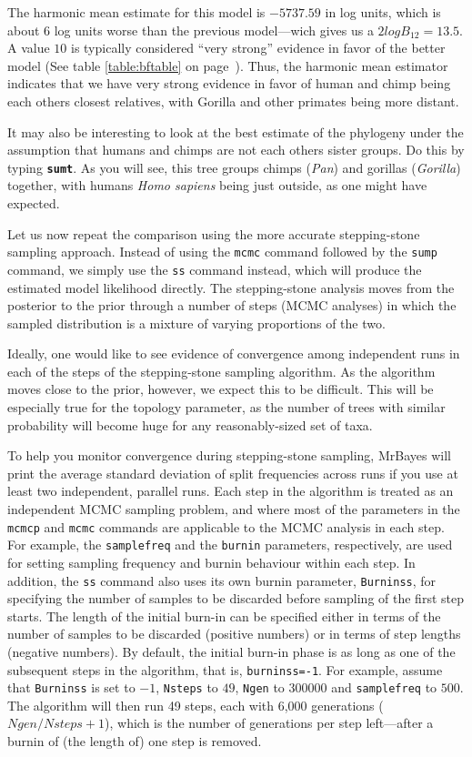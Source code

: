 \documentclass[12pt]{book}
\newcommand{\ttt}[1]{\texttt{#1}}
\newcommand{\tb}[1]{\ttt{\textbf{#1}}}
\begin{document}
The harmonic mean estimate for this model is $-5737.59$ in log units, which is about 6 log units
worse than the previous model---wich gives us a $2logB_{12} = 13.5$. A value $10$ is typically
considered ``very strong'' evidence in favor of the better model  (See table \ref{table:bftable} on page~\pageref{table:bftable}). Thus,
the harmonic mean estimator indicates that we have very strong evidence in favor of human and chimp
being each others closest relatives, with Gorilla and other primates being more distant.

It may also be interesting to look at the best estimate of the phylogeny under the assumption that
humans and chimps are not each others sister groups. Do this by typing \tb{sumt}. As you will see,
this tree groups chimps (\textit{Pan}) and gorillas (\textit{Gorilla}) together, with humans
\textit{Homo sapiens} being just outside, as one might have expected.

Let us now repeat the comparison using the more accurate stepping-stone sampling approach. Instead
of using the \texttt{mcmc} command followed by the \texttt{sump} command, we simply use the \texttt{ss}
command instead, which will produce the estimated model likelihood directly. The stepping-stone
analysis moves from the posterior to the prior through a number of steps (MCMC analyses) in which
the sampled distribution is a mixture of varying proportions of the two.

Ideally, one would like to see evidence of convergence among independent runs in each of the steps
of the stepping-stone sampling algorithm. As the algorithm moves close to the prior, however, we
expect this to be difficult. This will be especially true for the topology parameter, as the number
of trees with similar probability will become huge for any reasonably-sized set of taxa.

To help you monitor convergence during stepping-stone sampling, MrBayes will print the average
standard deviation of split frequencies across runs if you use at least two independent, parallel
runs. Each step in the algorithm is treated as an independent MCMC sampling problem, and where most
of the parameters in the \texttt{mcmcp} and \texttt{mcmc} commands are applicable to the MCMC analysis 
in each step. For example, the \texttt{samplefreq} and the \texttt{burnin} parameters, respectively, 
are used for setting sampling frequency and burnin behaviour within each step. In addition, the
\texttt{ss} command also uses its own burnin parameter, \texttt{Burninss}, for specifying the number of
samples to be discarded before sampling of the first step starts. The length of the initial burn-in
can be specified either in terms of the number of samples to be discarded (positive numbers) or in
terms of step lengths (negative numbers). By default, the initial burn-in phase is as long as one
of the subsequent steps in the algorithm, that is, \texttt{burninss=-1}. For example, assume that
\texttt{Burninss} is set to $-1$, \texttt{Nsteps} to $49$, \texttt{Ngen} to $300000$ and 
\texttt{samplefreq} to $500$. The algorithm will then run 49 steps, each with 6,000 generations 
($Ngen/Nsteps+1$), which is the number of generations per step left---after a burnin of (the 
length of) one step is removed.
\end{document}
